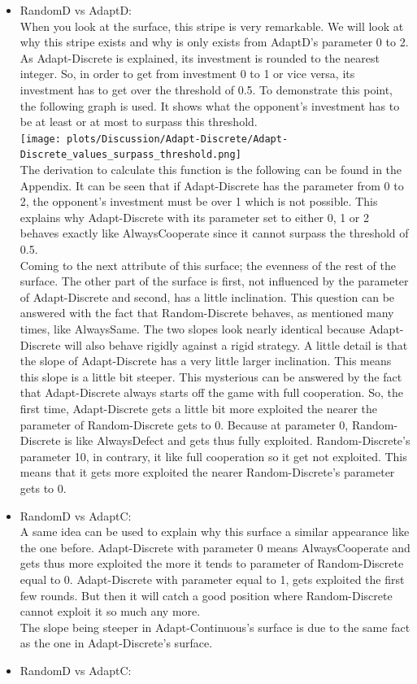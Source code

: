 \documentclass{article}
\begin{document}
\begin{itemize}
	\item RandomD vs AdaptD:\\
		When you look at the surface, this stripe is very remarkable.
		We will look at why this stripe exists and why is only exists from AdaptD's parameter 0 to 2.\\
		As Adapt-Discrete is explained, its investment is rounded to the nearest integer.
		So, in order to get from investment 0 to 1 or vice versa, its investment has to get over the threshold of 0.5.
		To demonstrate this point, the following graph is used.
		It shows what the opponent's investment has to be at least or at most to surpass this threshold.\\
		\texttt{[image: plots/Discussion/Adapt-Discrete/Adapt-Discrete\_values\_surpass\_threshold.png]}\\
		The derivation to calculate this function is the following can be found in the Appendix.
		It can be seen that if Adapt-Discrete has the parameter from 0 to 2, the opponent's investment must be over 1 which is not possible.
		This explains why Adapt-Discrete with its parameter set to either 0, 1 or 2 behaves exactly like AlwaysCooperate since it cannot surpass the threshold of 0.5.\\
		Coming to the next attribute of this surface; the evenness of the rest of the surface.
		The other part of the surface is first, not influenced by the parameter of Adapt-Discrete and second, has a little inclination.
		This question can be answered with the fact that Random-Discrete behaves, as mentioned many times, like AlwaysSame.
		The two slopes look nearly identical because Adapt-Discrete will also behave rigidly against a rigid strategy.
		A little detail is that the slope of Adapt-Discrete has a very little larger inclination.
		This means this slope is a little bit steeper.
		This mysterious can be answered by the fact that Adapt-Discrete always starts off the game with full cooperation.
		So, the first time, Adapt-Discrete gets a little bit more exploited the nearer the parameter of Random-Discrete gets to 0.
		Because at parameter 0, Random-Discrete is like AlwaysDefect and gets thus fully exploited.
		Random-Discrete's parameter 10, in contrary, it like full cooperation so it get not exploited.
		This means that it gets more exploited the nearer Random-Discrete's parameter gets to 0.\\
	\item RandomD vs AdaptC:\\
		A same idea can be used to explain why this surface a similar appearance like the one before.
		Adapt-Discrete with parameter 0 means AlwaysCooperate and gets thus more exploited the more it tends to parameter of Random-Discrete equal to 0.
		Adapt-Discrete with parameter equal to 1, gets exploited the first few rounds.
		But then it will catch a good position where Random-Discrete cannot exploit it so much any more.\\
		The slope being steeper in Adapt-Continuous's surface is due to the same fact as the one in Adapt-Discrete's surface.
	\item RandomD vs AdaptC:\\



\end{itemize}
\end{document}
